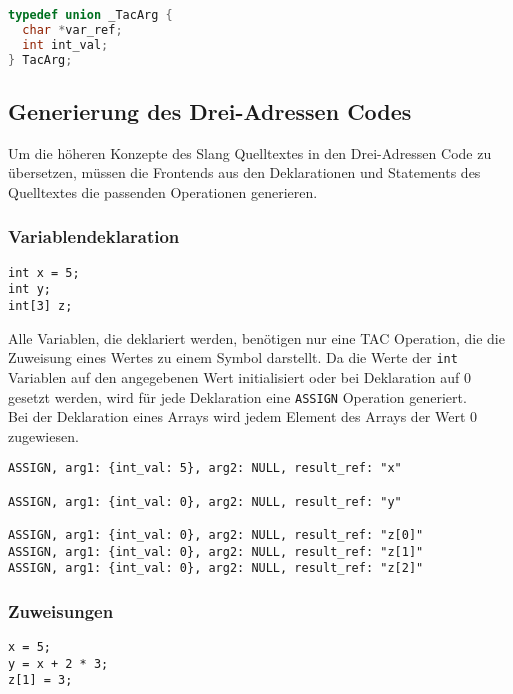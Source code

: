 \begin{lstlisting}[language=C++, caption={Drei-Adressen Code Argument}]
typedef union _TacArg {
  char *var_ref;
  int int_val;
} TacArg;
\end{lstlisting}

\subsection{Generierung des Drei-Adressen Codes}

Um die höheren Konzepte des Slang Quelltextes in den Drei-Adressen Code zu übersetzen, müssen die Frontends aus den Deklarationen und Statements des Quelltextes die passenden Operationen generieren.

\subsubsection{Variablendeklaration}

\begin{lstlisting}[caption={Beispielzuweisungen}]
int x = 5;
int y;
int[3] z;
\end{lstlisting}

Alle Variablen, die deklariert werden, benötigen nur eine \ac{TAC} Operation, die die Zuweisung eines Wertes zu einem Symbol darstellt.
Da die Werte der \texttt{int} Variablen auf den angegebenen Wert initialisiert oder bei Deklaration auf 0 gesetzt werden, wird für jede Deklaration eine \texttt{ASSIGN} Operation generiert.\\
Bei der Deklaration eines Arrays wird jedem Element des Arrays der Wert 0 zugewiesen.\\

\begin{lstlisting}[caption={Drei-Adressen Code für Variablendeklaration}]
ASSIGN, arg1: {int_val: 5}, arg2: NULL, result_ref: "x"

ASSIGN, arg1: {int_val: 0}, arg2: NULL, result_ref: "y"

ASSIGN, arg1: {int_val: 0}, arg2: NULL, result_ref: "z[0]"
ASSIGN, arg1: {int_val: 0}, arg2: NULL, result_ref: "z[1]"
ASSIGN, arg1: {int_val: 0}, arg2: NULL, result_ref: "z[2]"
\end{lstlisting}

\subsubsection{Zuweisungen}

\begin{lstlisting}[caption={Beispielzuweisungen}]
x = 5;
y = x + 2 * 3;
z[1] = 3;
\end{lstlisting}

